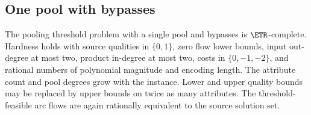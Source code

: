 \subsection{One pool with bypasses}\label{s2:one-pool}

\begin{theorem}\label{s2:one-pool-etr}
The pooling threshold problem with a single pool and bypasses is
$\ETR$-complete. Hardness holds with source qualities in $\{0,1\}$,
zero flow lower bounds, input out-degree at most two, product in-degree
at most two, costs in $\{0,-1,-2\}$, and rational numbers of polynomial
magnitude and encoding length. The attribute count and pool degrees
grow with the instance. Lower and upper quality bounds may be replaced
by upper bounds on twice as many attributes. The threshold-feasible
arc flows are again rationally equivalent to the source solution set.
\end{theorem}

